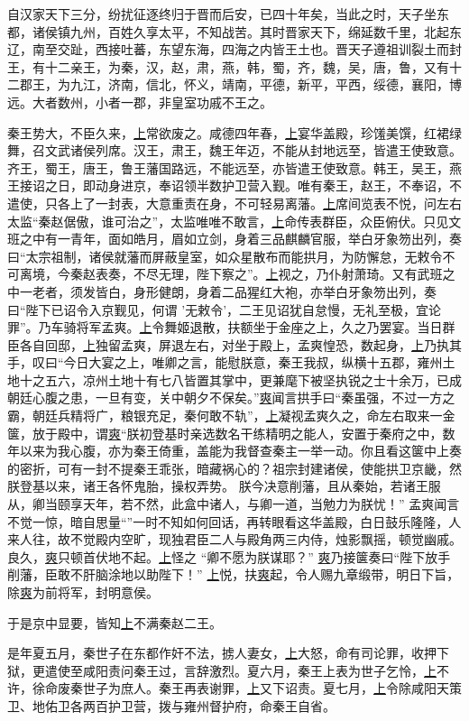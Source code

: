 \documentclass[UTF8]{ctexart}
\begin{document}
自汉家天下三分，纷扰征逐终归于晋而后安，已四十年矣，当此之时，天子坐东都，诸侯镇九州，百姓久享太平，不知战苦。其时晋家天下，绵延数千里，北起东辽，南至交趾，西接吐蕃，东望东海，四海之内皆王土也。晋天子遵祖训裂土而封王，有十二亲王，为秦，汉，赵，肃，燕，韩，蜀，齐，魏，吴，唐，鲁，又有十二郡王，为九江，济南，信北，怀义，靖南，平德，新平，平西，绥德，襄阳，博远。大者数州，小者一郡，非皇室功戚不王之。


秦王势大，不臣久来，\uline{上}常欲废之。咸德四年春，\uline{上}宴华盖殿，珍馐美馔，红裙绿舞，召文武诸侯列席。汉王，肃王，魏王年迈，不能从封地远至，皆遣王使致意。齐王，蜀王，唐王，鲁王藩国路远，不能远至，亦皆遣王使致意。韩王，吴王，燕王接诏之日，即动身进京，奉诏领半数护卫营入觐。唯有秦王，赵王，不奉诏，不遣使，只各上了一封表，大意重责在身，不可轻易离藩。\uline{上}席间览表不悦，问左右太监“秦赵倨傲，谁可治之”，太监唯唯不敢言，\uline{上}命传表群臣，众臣俯伏。只见文班之中有一青年，面如皓月，眉如立剑，身着三品麒麟官服，举白牙象笏出列，奏曰“太宗祖制，诸侯就藩而屏蔽皇室，如众星散布而能拱月，为防懈怠，无敕令不可离境，今秦赵表奏，不尽无理，陛下察之”。\uline{上}视之，乃仆射萧琦。又有武班之中一老者，须发皆白，身形健朗，身着二品猩红大袍，亦举白牙象笏出列，奏曰“陛下已诏令入京觐见，何谓 ’无敕令’，二王见诏犹自怠慢，无礼至极，宜论罪”。乃车骑将军孟爽。\uline{上}令舞姬退散，扶额坐于金座之上，久之乃罢宴。当日群臣各自回邸，\uline{上}独留孟爽，屏退左右，对坐于殿上，孟爽惶恐，数起身，\uline{上}乃执其手，叹曰“今日大宴之上，唯卿之言，能慰朕意，秦王我叔，纵横十五郡，雍州土地十之五六，凉州土地十有七八皆置其掌中，更兼麾下被坚执锐之士十余万，已成朝廷心腹之患，一旦有变，关中朝夕不保矣。”\uline{爽}闻言拱手曰“秦虽强，不过一方之霸，朝廷兵精将广，粮银充足，秦何敢不轨”，\uline{上}凝视孟爽久之，命左右取来一金箧，放于殿中，谓\uline{爽}“朕初登基时亲选数名干练精明之能人，安置于秦府之中，数年以来为我心腹，亦为秦王倚重，盖能为我督查秦主一举一动。你且看这箧中上奏的密折，可有一封不提秦王乖张，暗藏祸心的？祖宗封建诸侯，使能拱卫京畿，然朕登基以来，诸王各怀鬼胎，操权弄势。 朕今决意削藩，且从秦始，若诸王服从，卿当颐享天年，若不然，此盒中诸人，与卿一道，当勉力为朕忧！” 孟爽闻言不觉一惊，暗自思量“”一时不知如何回话，再转眼看这华盖殿，白日鼓乐隆隆，人来人往，故不觉殿内空旷，现独君臣二人与殿角两三内侍，烛影飘摇，顿觉幽戚。良久，\uline{爽}只顿首伏地不起。\uline{上}怪之 “卿不愿为朕谋耶？” \uline{爽}乃接箧奏曰“陛下放手削藩，臣敢不肝脑涂地以助陛下！” \uline{上}悦，扶\uline{爽}起，令人赐九章缎带，明日下旨，除\uline{爽}为前将军，封明意侯。


于是京中显要，皆知\uline{上}不满秦赵二王。


是年夏五月，秦世子在东都作奸不法，掳人妻女，\uline{上}大怒，命有司论罪，收押下狱，更遣使至咸阳责问秦王过，言辞激烈。夏六月，秦王上表为世子乞怜，\uline{上}不许，徐命废秦世子为庶人。秦王再表谢罪，\uline{上}又下诏责。夏七月，\uline{上}令除咸阳天策卫、地佑卫各两百护卫营，拨与雍州督护府，命秦王自省。
\end{document}
